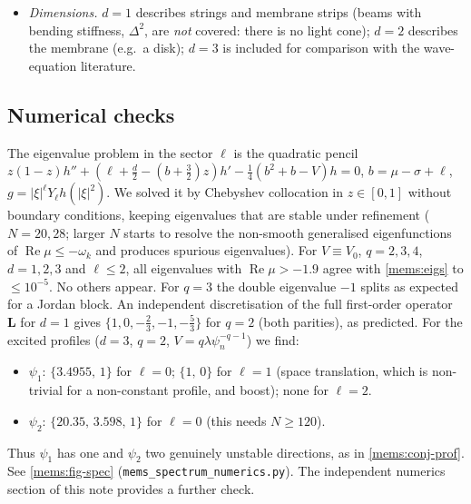 \begin{itemize}[leftmargin=1.2em]
small perturbations of the data, of the damping and of the permittivity. It
then occurs on a nearby spacelike hypersurface with a boosted ODE profile.
For $R=1$ the threshold $\pi^2/8\approx1.234$ should be compared with the
static pull-in values $\lambda^*\approx0.350$ (interval $(-1,1)$), $0.789$ (unit
disk) and $1.299$ (unit ball in $\mathbb R^3$) (\texttt{mems\_damped\_ode.py}).
\item \emph{Dimensions.} $d=1$ describes strings and membrane strips (beams with
bending stiffness, $\Delta^2$, are \emph{not} covered: there is no light cone);
$d=2$ describes the membrane (e.g.\ a disk); $d=3$ is included for comparison
with the wave-equation literature.
\end{itemize}

\subsection{Numerical checks}
\label{mems:sec-num}
The eigenvalue problem in the sector $\ell$ is the quadratic pencil
$z(1-z)h''+(\ell+\frac d2-(b+\frac32)z)h'-\frac14(b^2+b-V)h=0$,
$b=\mu-\sigma+\ell$, $g=|\xi|^\ell Y_\ell h(|\xi|^2)$. We solved it by Chebyshev
collocation in $z\in[0,1]$ without boundary conditions, keeping eigenvalues
that are stable under refinement ($N=20,28$; larger $N$ starts to resolve the
non-smooth generalised eigenfunctions of $\operatorname{Re}\mu\le-\omega_k$ and produces
spurious eigenvalues). For $V\equiv V_0$, $q=2,3,4$, $d=1,2,3$ and
$\ell\le2$, all eigenvalues with $\operatorname{Re}\mu>-1.9$ agree with
\eqref{mems:eigs} to $\le10^{-5}$. No others appear. For $q=3$ the double
eigenvalue $-1$ splits as expected for a Jordan block. An independent
discretisation of the full first-order operator $\mathbf L$ for $d=1$ gives
$\{1,0,-\frac23,-1,-\frac53\}$ for $q=2$ (both parities), as predicted.
For the excited profiles ($d=3$, $q=2$, $V=q\lambda\psi_n^{-q-1}$) we find:
\begin{itemize}[nosep]
\item $\psi_1$: $\{3.4955,\,1\}$ for $\ell=0$; $\{1,\,0\}$ for $\ell=1$ (space
translation, which is non-trivial for a non-constant profile, and boost); none
for $\ell=2$.
\item $\psi_2$: $\{20.35,\,3.598,\,1\}$ for $\ell=0$ (this needs $N\ge120$).
\end{itemize}
Thus $\psi_1$ has one and $\psi_2$ two genuinely unstable directions, as in
\cref{mems:conj-prof}. See \cref{mems:fig-spec}
(\texttt{mems\_spectrum\_numerics.py}). The independent numerics section of this
note provides a further check.

